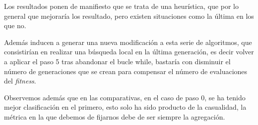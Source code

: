 \begin{table}[H]
    \centering
    \caption{Comparativa en AM-(10,1) en dónde se posiciona la búsqueda local}
    \label{Tabla:comparativas-algoritmos-AM-cambiandPAso}
\end{table}

Los resultados ponen de manifiesto que se trata de una heurística, que por lo general que mejoraría los resultado,
pero existen situaciones como la última en los que no. 

Además inducen a generar una nueva modificación a esta serie
de algoritmos, que consistirían en realizar una búsqueda 
local en la última generación, es decir volver a aplicar el 
paso 5 tras abandonar el bucle while, bastaría con disminuir 
el número de generaciones que se crean para compensar el número de evaluaciones del \textit{fitness}. 

Observemos además que en las comparativas, en el caso de paso 0, se ha tenido mejor clasificación en el primero, esto solo ha sido producto de la casualidad, la métrica en la que debemos de fijarnos debe de ser siempre la agregación. 









